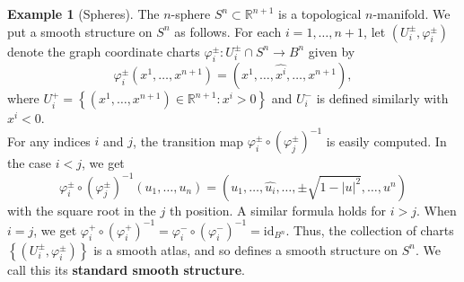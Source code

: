 \documentclass[reqno]{amsart}
\theoremstyle{plain}%
\theoremstyle{definition}
\newtheorem{example}[theorem]{Example}
\theoremstyle{remark}
\newcommand{\id}{{\mathrm{id}}}
\begin{document}
        \begin{example}[Spheres]
            The $n$-sphere $S^{n}\subset \mathbb{R}^{n+1}$ is a topological
            $n$-manifold. We put a smooth structure on $S^{n}$ as follows.
            For each $i = 1, \ldots, n+1$, let
            $\left( U_i^{\pm}, \varphi_i^{\pm} \right) $ denote the graph
            coordinate charts 
            $\varphi_i^{\pm}  \colon U_i^{\pm} \cap S^{n} \to B^{n}$ given by
            \[
            \varphi_i^{\pm} \left( x^{1},\ldots, x^{n+1} \right) 
            = \left( x^{1}, \ldots, \hat{x^{i}},
            \ldots, x^{n+1}\right) ,
            \] 
            where $U_i^{+} =
            \left\{ \left( x^{1},\ldots, x^{n+1} \right) \in \mathbb{R}^{n+1} \colon
            x^{i}>0\right\} $ and $U_i^{-}$ is defined similarly with
            $x^{i}<0$.\\
            For any indices $i$ and $j$, the transition map
            $\varphi_i^{\pm} \circ \left( \varphi_j^{\pm} \right)^{-1}$ is
            easily computed. In the case $i<j$, we get
            \[
            \varphi_i^{\pm}\circ \left( \varphi_j^{\pm} \right)^{-1}
            \left( u_1, \ldots, u_{n} \right) 
            = \left( u_1, \ldots, \hat{u_i},\ldots,
            \pm \sqrt{1- \left| u \right|^2} ,\ldots,
            u^{n}\right) 
            \] 
            with the square root in the $j$ th position. A similar formula
            holds for $i>j$. When $i = j$, we get
            $\varphi_i^{+} \circ \left( \varphi_i^{+} \right)^{-1}
            = \varphi_i^{-} \circ \left( \varphi_i^{-} \right)^{-1}
            = \id_{B^{n}}$. Thus, the collection of charts
            $\left\{ \left( U_i^{\pm}, \varphi_i^{\pm} \right)  \right\} $ is
            a smooth atlas, and so defines a smooth structure on $S^{n}$. We
            call this its \textbf{standard smooth structure}.
        \end{example}
\end{document}
